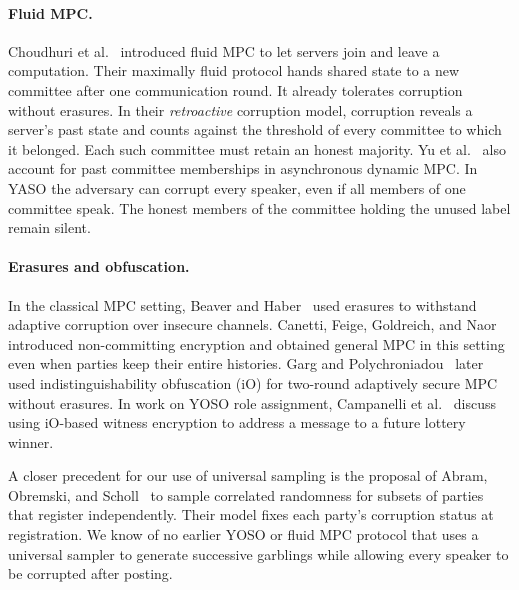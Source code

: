 \paragraph{Fluid MPC.}
Choudhuri et al.~\cite{ChoudhuriEtAl2021FluidMPC} introduced fluid MPC
to let servers join and leave a computation.  Their maximally fluid
protocol hands shared state to a new committee after one communication
round.  It already tolerates corruption without erasures.  In their
\emph{retroactive} corruption model, corruption reveals a server's past
state and counts against the threshold of every committee to which it
belonged.  Each such committee must retain an honest majority.
Yu et al.~\cite{YuEtAl2025ADMPC} also account for past committee
memberships in asynchronous dynamic MPC.  In YASO the adversary can
corrupt every speaker, even if all members of one committee speak.  The
honest members of the committee holding the unused label remain silent.

\paragraph{Erasures and obfuscation.}
In the classical MPC setting, Beaver and Haber~\cite{BeaverHaber1992Dynamic}
used erasures to withstand adaptive corruption over insecure channels.
Canetti, Feige, Goldreich, and Naor~\cite{CanettiEtAl1996AdaptiveMPC}
introduced non-committing encryption and obtained general MPC in this
setting even when parties keep their entire histories.  Garg and
Polychroniadou~\cite{GargPolychroniadou2015AdaptiveMPC} later used
indistinguishability obfuscation (iO) for two-round adaptively secure MPC
without erasures.  In work on YOSO role assignment, Campanelli
et al.~\cite{CampanelliEtAl2022EncryptionFuture} discuss using iO-based
witness encryption to address a message to a future lottery winner.

A closer precedent for our use of universal sampling is the proposal of
Abram, Obremski, and Scholl~\cite{AbramObremskiScholl2023PartyDynamic,Abram2024Thesis}
to sample correlated randomness for subsets of parties that register
independently.  Their model fixes each party's corruption status at
registration.  We know of no earlier YOSO or fluid MPC protocol that
uses a universal sampler to generate successive garblings while allowing
every speaker to be corrupted after posting.
